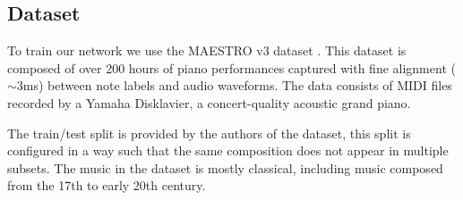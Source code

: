 \documentclass[11pt, twocolumn]{article}
\begin{document}
\subsection{Dataset}
To train our network we use the MAESTRO v3 dataset \cite{hawthorne2018enabling}. This dataset is composed of over 200 hours of piano performances captured with fine alignment ($\sim$3ms) between note labels and audio waveforms. The data consists of MIDI files recorded by a Yamaha Disklavier, a concert-quality acoustic grand piano. 
\par
The train/test split is provided by the authors of the dataset, this split is configured in a way such that the same composition does not appear in multiple subsets. The music in the dataset is mostly classical, including music composed from the 17th to early 20th century.
\end{document}
